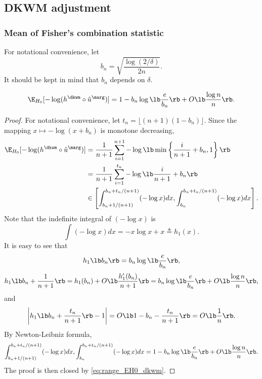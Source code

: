 
\subsection{DKWM adjustment}
\subsubsection{Mean of Fisher's combination statistic}
  For notational convenience, let
  \[b_{n} = \sqrt{\frac{\log(2/\delta)}{2n}}.\]
  It should be kept in mind that $b_n$ depends on $\delta$.
\begin{thm}\label{thm:fisher_DKWM}
  \[\E_{H_0}[-\log (h^\dkwm \circ \hat{u}^\marg)] = 1 - b_n\log\lb\frac{e}{b_n}\rb + O\lb\frac{\log n}{n}\rb.\]
\end{thm}

\begin{proof}
  For notational convenience, let $t_n = \lfloor (n + 1)(1 - b_n)\rfloor$. Since the mapping $x\mapsto -\log(x + b_n)$ is monotone decreasing,
  \begin{align}
    \E_{H_0}[-\log (h^\dkwm \circ \hat{u}^\marg)]
    &= \frac{1}{n+1}\sum_{i=1}^{n+1}-\log\lb\min\left\{\frac{i}{n+1} + b_{n}, 1\right\}\rb\nonumber\\
    &= \frac{1}{n+1}\sum_{i=1}^{t_n}-\log\lb\frac{i}{n+1} + b_{n}\rb\nonumber\\
    & \in \left[\int_{b_n + 1/(n + 1)}^{b_n + t_n / (n + 1)}(-\log x)dx, \int_{b_n}^{b_n + t_n / (n + 1)}(-\log x)dx\right].\label{eq:range_EH0_dkwm}
  \end{align}
  Note that the indefinite integral of $(-\log x)$ is
  \[\int (-\log x)dx = -x\log x + x \triangleq h_1(x).\]
  It is easy to see that
  \[h_1\lb b_n\rb = b_n\log\lb\frac{e}{b_n}\rb,\]
  \[h_1\lb b_n + \frac{1}{n+1}\rb = h_1(b_n) + O\lb\frac{h_1'(b_n)}{n+1}\rb = b_n\log\lb\frac{e}{b_n}\rb + O\lb\frac{\log n}{n}\rb,\]
  and
  \[\bigg|h_1\lb b_n + \frac{t_n}{n+1}\rb - 1\bigg| = O\lb 1 - b_n - \frac{t_n}{n+1}\rb = O\lb\frac{1}{n}\rb.\]
  By Newton-Leibniz formula,
  \[\int_{b_n + 1/(n+1)}^{b_n + t_n / (n + 1)}(-\log x)dx, \int_{b_n}^{b_n + t_n / (n + 1)}(-\log x)dx = 1 - b_n\log\lb\frac{e}{b_n}\rb + O\lb\frac{\log n}{n}\rb.\]
  The proof is then closed by \eqref{eq:range_EH0_dkwm}.
\end{proof}

